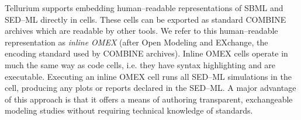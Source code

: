 \documentclass[10pt,letterpaper]{article}
\begin{document}


Tellurium supports embedding human--readable representations of SBML \cite{smith2009antimony} and SED--ML \cite{choi2016phrased} directly in cells. These cells can be exported as standard COMBINE archives which are readable by other tools. We refer to this human--readable representation as \textit{inline OMEX} (after Open Modeling and EXchange, the encoding standard used by COMBINE archives).
Inline OMEX cells operate in much the same way as code cells, i.e. they have syntax highlighting and are executable. Executing an inline OMEX cell runs all SED--ML simulations in the cell, producing any plots or reports declared in the SED--ML. A major advantage of this approach is that it offers a means of authoring transparent, exchangeable modeling studies without requiring technical knowledge of standards.


\end{document}
